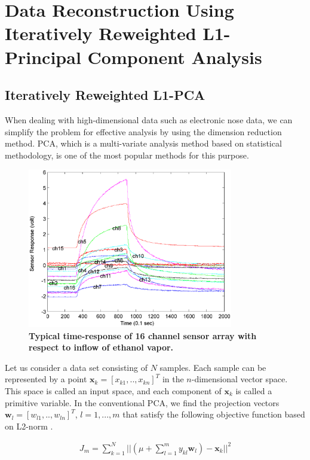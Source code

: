 \documentclass[10pt,letterpaper]{article}
\begin{document}
\section*{Data Reconstruction Using Iteratively Reweighted L1-Principal Component Analysis}
\subsection*{Iteratively Reweighted L1-PCA}


When dealing with high-dimensional data such as electronic nose data, we can simplify the problem for effective analysis by using the dimension reduction method. 
PCA, which is a multi-variate analysis method based on statistical methodology, is one of the most popular methods for this purpose. 

\begin{figure}[t]
	\centering
    \includegraphics[width=0.8\textwidth]{fig1.eps}
    \caption{\bf{Typical time-response of 16 channel sensor array with respect to inflow of ethanol vapor.} \label{null Fig. 1}}
\end{figure}


Let us consider a data set consisting of $N$ samples. 
Each sample can be represented by a point $\textbf{x}_{k}=[x_{k1},..,x_{kn}]^T$ in the $n$-dimensional vector space. 
This space is called an input space, and each component of $\textbf{x}_{k}$ is called a primitive variable. 
In the conventional PCA, we find the projection vectors $\textbf{w}_{l}=[w_{l1},..,w_{ln}]^T$, $l = 1, ..., m$ that satisfy the following objective function based on L2-norm \cite{duda1973pattern}.

\begin{eqnarray}
\label{eq:IEEESensors3}
	{J_m} = \sum\limits_{k=1}^{N}||\left(\mu+\sum\limits_{l=1}^{m}{y}_{kl}\textbf{w}_l\right)-\textbf{x}_k||^2
\end{eqnarray}
\end{document}
